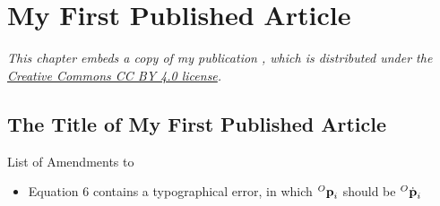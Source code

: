 \chapter{My First Published Article} \label{chap:article1}
\begin{displayquote} \emph{%
	This chapter embeds a copy of my publication \cite{example3}, which is distributed under the \href{https://creativecommons.org/licenses/by/4.0/}{Creative Commons CC BY 4.0 license}.
} \end{displayquote}




\section{The Title of My First Published Article}
List of Amendments to \cite{example3}
\begin{itemize}[topsep=0pt,beginpenalty=10000,first=]
	\item Equation 6 contains a typographical error, in which ${}^O\text{\textbf{p}}_i$ should be ${}^O\dot{\text{\textbf{p}}}_i$
\end{itemize}





